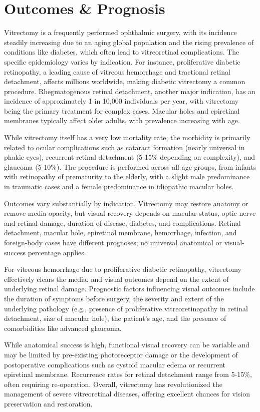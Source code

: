 \section*{Outcomes \& Prognosis}
Vitrectomy is a frequently performed ophthalmic surgery, with its incidence steadily increasing due to an aging global population and the rising prevalence of conditions like diabetes, which often lead to vitreoretinal complications. The specific epidemiology varies by indication. For instance, proliferative diabetic retinopathy, a leading cause of vitreous hemorrhage and tractional retinal detachment, affects millions worldwide, making diabetic vitrectomy a common procedure. Rhegmatogenous retinal detachment, another major indication, has an incidence of approximately 1 in 10,000 individuals per year, with vitrectomy being the primary treatment for complex cases. Macular holes and epiretinal membranes typically affect older adults, with prevalence increasing with age. 

While vitrectomy itself has a very low mortality rate, the morbidity is primarily related to ocular complications such as cataract formation (nearly universal in phakic eyes), recurrent retinal detachment (5-15\% depending on complexity), and glaucoma (5-10\%). The procedure is performed across all age groups, from infants with retinopathy of prematurity to the elderly, with a slight male predominance in traumatic cases and a female predominance in idiopathic macular holes.

Outcomes vary substantially by indication. Vitrectomy may restore anatomy or remove media opacity, but visual recovery depends on macular status, optic-nerve and retinal damage, duration of disease, diabetes, and complications. Retinal detachment, macular hole, epiretinal membrane, hemorrhage, infection, and foreign-body cases have different prognoses; no universal anatomical or visual-success percentage applies.

For vitreous hemorrhage due to proliferative diabetic retinopathy, vitrectomy effectively clears the media, and visual outcomes depend on the extent of underlying retinal damage. Prognostic factors influencing visual outcomes include the duration of symptoms before surgery, the severity and extent of the underlying pathology (e.g., presence of proliferative vitreoretinopathy in retinal detachment, size of macular hole), the patient's age, and the presence of comorbidities like advanced glaucoma. 

While anatomical success is high, functional visual recovery can be variable and may be limited by pre-existing photoreceptor damage or the development of postoperative complications such as cystoid macular edema or recurrent epiretinal membrane. Recurrence rates for retinal detachment range from 5-15\%, often requiring re-operation. Overall, vitrectomy has revolutionized the management of severe vitreoretinal diseases, offering excellent chances for vision preservation and restoration.

